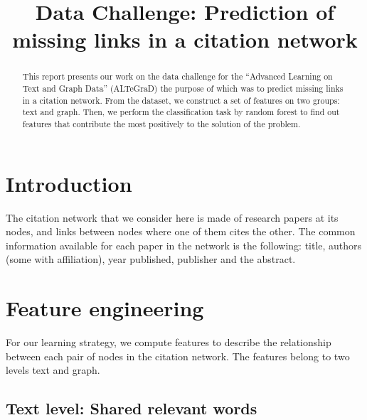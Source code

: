 \documentclass{article}
\title{Data Challenge: Prediction of missing links in a citation network}
\begin{document}
\ninept

\maketitle

\begin{abstract}
This report presents our work on the data challenge for the \enquote{Advanced Learning on Text and Graph Data} (ALTeGraD) the purpose of which was to predict missing links in a citation network. From the dataset, we construct a set of features on two groups: text and graph. Then, we perform the classification task by random forest to find out features that contribute the most positively to the solution of the problem.
\end{abstract}


\section{Introduction}

The citation network that we consider here is made of research papers at its nodes, and links between nodes where one of them cites the other. The common information available for each paper in the network is the following: title, authors (some with affiliation), year published, publisher and the abstract.

\section{Feature engineering}

For our learning strategy, we compute features to describe the relationship between each pair of nodes in the citation network. The features belong to two levels text and graph.

\subsection{Text level: Shared relevant words}
\end{document}
